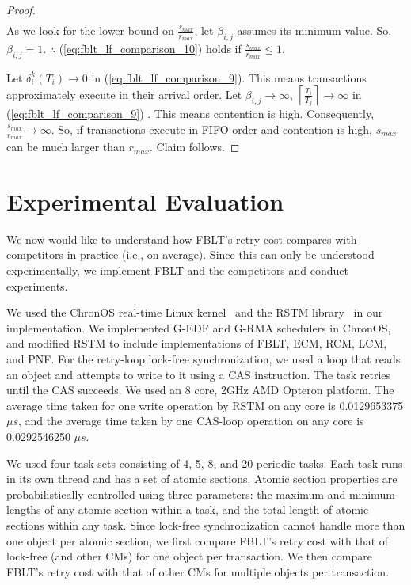\documentclass[prodmode,acmtecs]{acmsmall}
\begin{document}
\begin{compactenum}
\begin{proof}
\begin{eqnarray}
\end{eqnarray}
As we look for the lower bound on $\frac{s_{max}}{r_{max}}$, let
$\beta_{i,j}$ assumes its minimum value. So, $\beta_{i,j}=1$. $\therefore$
(\ref{eq:fblt_lf_comparison_10}) holds if $\frac{s_{max}}{r_{max}}\le1$.

Let $\delta_{i}^{k}(T_{i})\rightarrow0$ in (\ref{eq:fblt_lf_comparison_9}).
This means transactions approximately execute in their arrival order.
Let $\beta_{i,j}\rightarrow\infty,\,\left\lceil \frac{T_{i}}{T_{j}}\right\rceil \rightarrow\infty$
in (\ref{eq:fblt_lf_comparison_9}) . This means contention is high.
Consequently, $\frac{s_{max}}{r_{max}}\rightarrow\infty$. So, if
transactions execute in FIFO order and contention is high, $s_{max}$
can be much larger than $r_{max}$. Claim follows.

\end{proof}


\section{Experimental Evaluation}\label{exp_eval}

We now would like to understand how FBLT's retry cost compares with competitors in practice (i.e., on average). Since this can only be understood experimentally, we implement FBLT and the competitors and conduct experiments. 


We used the ChronOS real-time Linux kernel~\cite{dellinger2011chronos}
and the RSTM library~\cite{marathe2006lowering} in our implementation. We implemented G-EDF and G-RMA schedulers in ChronOS, and modified RSTM to include implementations of FBLT, ECM, RCM, LCM, and PNF. For the retry-loop lock-free synchronization, we used a loop that reads an object and attempts to write to it using a CAS  instruction. The task retries until the CAS succeeds. We used an 8 core, 2GHz AMD Opteron platform. The average time taken for one write operation by RSTM on any core is 0.0129653375$\mu s$, and the average time taken by one CAS-loop operation on any core is 0.0292546250 $\mu s$.

We used four task sets consisting of 4, 5, 8, and 20 periodic tasks. Each task runs in its own thread and has a set of atomic sections. Atomic section properties are probabilistically controlled using three parameters: the maximum and minimum lengths of any atomic section within a task, and the total length of atomic sections within any task. Since lock-free synchronization cannot handle more than one object per atomic section, we first compare FBLT's retry cost with that of lock-free (and other CMs) for one object per transaction. We then compare FBLT's retry cost with that of other CMs for multiple objects per transaction.



\end{compactenum}
\end{document}
